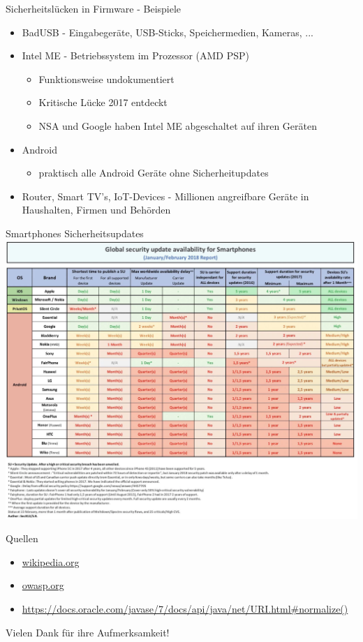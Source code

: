 \documentclass[10pt]{beamer}
\begin{document}
\begin{frame}[fragile]{Sicherheitsl\"ucken in Firmware - Beispiele}
  \begin{itemize}
    \item BadUSB - Eingabeger\"ate, USB-Sticks, Speichermedien, Kameras, ...
    \item Intel ME - Betriebssystem im Prozessor (AMD PSP)
      \begin{itemize}
        \item Funktionsweise undokumentiert
        \item Kritische L\"ucke 2017 entdeckt
        \item NSA und Google haben Intel ME abgeschaltet auf ihren Ger\"aten
      \end{itemize}
    \item Android
      \begin{itemize}
        \item praktisch alle Android Ger\"ate ohne Sicherheitupdates
      \end{itemize}
    \item Router, Smart TV's, IoT-Devices - Millionen angreifbare Ger\"ate in Haushalten, Firmen und Beh\"orden
  \end{itemize}
\end{frame}

\begin{frame}[fragile]{Smartphones Sicherheitsupdates}
  \includegraphics[scale=0.5]{android_sub}
  \newline
\end{frame}

\begin{frame}[fragile]{Quellen}
  \begin{itemize}
    \item \url{wikipedia.org}
    \item \url{owasp.org}
    \item \url{https://docs.oracle.com/javase/7/docs/api/java/net/URI.html#normalize()}
  \end{itemize}
\end{frame}

\begin{frame}[fragile]{}
  \huge Vielen Dank f\"ur ihre Aufmerksamkeit!
\end{frame}
\end{document}
